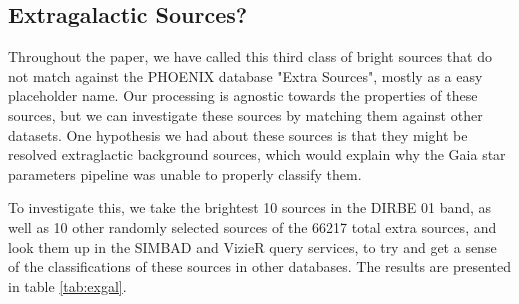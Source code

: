 \documentclass{aa}
\begin{document}

\subsection{Extragalactic Sources?}
\label{sec:extragalactic?}

Throughout the paper, we have called this third class of bright sources that do not match against the PHOENIX database "Extra Sources", mostly as a easy placeholder name. Our processing is agnostic towards the properties of these sources, but we can investigate these sources by matching them against other datasets. One hypothesis we had about these sources is that they might be resolved extraglactic background sources, which would explain why the Gaia star parameters pipeline was unable to properly classify them.
 
To investigate this, we take the brightest 10 sources in the DIRBE 01 band, as well as 10 other randomly selected sources of the 66217 total extra sources, and look them up in the SIMBAD and VizieR query services, to try and get a sense of the classifications of these sources in other databases. The results are presented in table \ref{tab:exgal}.
\end{document}
